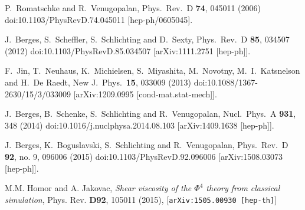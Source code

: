 \documentclass[aps,prd,twocolumn,showpacs,superscriptaddress,groupedaddress]{revtex4}  %
\begin{document}
\begin{thebibliography}{99}
  P.~Romatschke and R.~Venugopalan,
  Phys.\ Rev.\ D {\bf 74}, 045011 (2006)
  doi:10.1103/PhysRevD.74.045011
  [hep-ph/0605045].

  J.~Berges, S.~Scheffler, S.~Schlichting and D.~Sexty,
  Phys.\ Rev.\ D {\bf 85}, 034507 (2012)
  doi:10.1103/PhysRevD.85.034507
  [arXiv:1111.2751 [hep-ph]].


  F.~Jin, T.~Neuhaus, K.~Michielsen, S.~Miyashita, M.~Novotny, M.~I.~Katsnelson and H.~De Raedt,
  New J.\ Phys.\  {\bf 15}, 033009 (2013)
  doi:10.1088/1367-2630/15/3/033009
  [arXiv:1209.0995 [cond-mat.stat-mech]].

  J.~Berges, B.~Schenke, S.~Schlichting and R.~Venugopalan,
  Nucl.\ Phys.\ A {\bf 931}, 348 (2014)
  doi:10.1016/j.nuclphysa.2014.08.103
  [arXiv:1409.1638 [hep-ph]].

  J.~Berges, K.~Boguslavski, S.~Schlichting and R.~Venugopalan,
  Phys.\ Rev.\ D {\bf 92}, no. 9, 096006 (2015)
  doi:10.1103/PhysRevD.92.096006
  [arXiv:1508.03073 [hep-ph]].

M.M. Homor and A. Jakovac,
\emph{Shear viscosity of the $\Phi^4$ theory from classical simulation},
Phys. Rev. {\bf D92}, 105011 (2015),
[{\tt arXiv:1505.00930 [hep-th]}]







\end{thebibliography}
\end{document}
